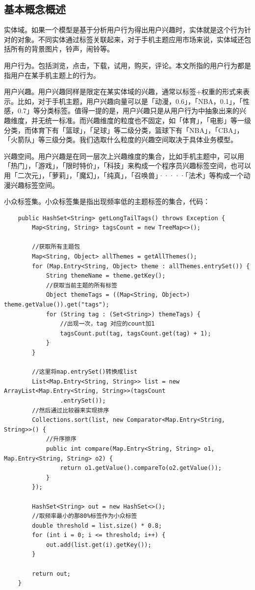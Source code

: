   \subsection{基本概念概述}
  实体域。如果一个模型是基于分析用户行为得出用户兴趣时，实体就是这个行为针对的对象。不同实体通过标签关联起来，对于手机主题应用市场来说，实体域还包括所有的背景图片，铃声，闹铃等。

  用户行为。包括浏览，点击，下载，试用，购买，评论。本文所指的用户行为都是指用户在某手机主题上的行为。
  
  用户兴趣。用户兴趣同样是限定在某实体域的兴趣，通常以标签+权重的形式来表示。比如，对于手机主题，用户兴趣向量可以是「动漫，0.6」，「NBA，0.1」，「性感，0.7」等分类标签。值得一提的是，用户兴趣只是从用户行为中抽象出来的兴趣维度，并无统一标准。而兴趣维度的粒度也不固定，如「体育」，「电影」等一级分类，而体育下有「篮球」，「足球」等二级分类，篮球下有「NBA」，「CBA」，「火箭队」等三级分类。我们选取什么粒度的兴趣空间取决于具体业务模型。

  兴趣空间。用户兴趣是在同一层次上兴趣维度的集合，比如手机主题中，可以用「热门」，「游戏」，「限时特价」，「科技」来构成一个程序员兴趣标签空间，也可以用「二次元」，「萝莉」，「魔幻」，「纯真」，「召唤兽」·····「法术」等构成一个动漫兴趣标签空间。

  小众标签集。小众标签集是指出现频率低的主题标签的集合，代码：
  \begin{lstlisting}
    public HashSet<String> getLongTailTags() throws Exception {
        Map<String, String> tagsCount = new TreeMap<>();

        //获取所有主题包
        Map<String, Object> allThemes = getAllThemes();
        for (Map.Entry<String, Object> theme : allThemes.entrySet()) {
            String themeName = theme.getKey();
            //获取当前主题的所有标签
            Object themeTags = ((Map<String, Object>) theme.getValue()).get("tags");
            for (String tag : (Set<String>) themeTags) {
                //出现一次，tag 对应的count加1
                tagsCount.put(tag, tagsCount.get(tag) + 1);
            }
        }

        //这里将map.entrySet()转换成list
        List<Map.Entry<String, String>> list = new ArrayList<Map.Entry<String, String>>(tagsCount
                .entrySet());
        //然后通过比较器来实现排序
        Collections.sort(list, new Comparator<Map.Entry<String, String>>() {
            //升序排序
            public int compare(Map.Entry<String, String> o1, Map.Entry<String, String> o2) {
                return o1.getValue().compareTo(o2.getValue());
            }
        });

        HashSet<String> out = new HashSet<>();
        //取频率最小的那80%标签作为小众标签
        double threshold = list.size() * 0.8;
        for (int i = 0; i <= threshold; i++) {
            out.add(list.get(i).getKey());
        }

        return out;
    }
  \end{lstlisting}

